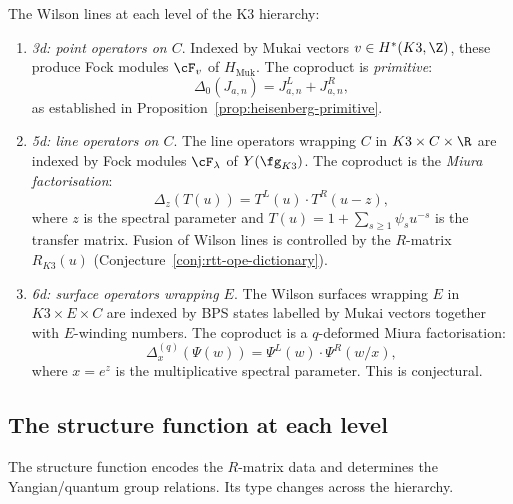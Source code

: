 \begin{construction}
\label{constr:k3-wilson-hierarchy}
The Wilson lines at each level of the K3 hierarchy:
\begin{enumerate}[label=\textup{(\roman*)}]
 \item \emph{3d: point operators on $C$}. Indexed by Mukai vectors $v \in H^*(K3, \Z)$, these produce Fock modules $\cF_v$ of $H_{\mathrm{Muk}}$. The coproduct is \emph{primitive}:
 \[
 \Delta_0(J_{a,n}) = J_{a,n}^L + J_{a,n}^R,
 \]
 as established in Proposition~\ref{prop:heisenberg-primitive}.

 \item \emph{5d: line operators on $C$}. The line operators wrapping $C$ in $K3 \times C \times \R$ are indexed by Fock modules $\cF_\lambda$ of $Y(\fg_{K3})$. The coproduct is the \emph{Miura factorisation}:
 \[
 \Delta_z(T(u)) = T^L(u) \cdot T^R(u - z),
 \]
 where $z$ is the spectral parameter and $T(u) = 1 + \sum_{s \geq 1} \psi_s u^{-s}$ is the transfer matrix. Fusion of Wilson lines is controlled by the $R$-matrix $R_{K3}(u)$ (Conjecture~\ref{conj:rtt-ope-dictionary}).

 \item \emph{6d: surface operators wrapping $E$}. The Wilson surfaces wrapping $E$ in $K3 \times E \times C$ are indexed by BPS states labelled by Mukai vectors together with $E$-winding numbers. The coproduct is a $q$-deformed Miura factorisation:
 \[
 \Delta_x^{(q)}(\Psi(w)) = \Psi^L(w) \cdot \Psi^R(w/x),
 \]
 where $x = e^z$ is the multiplicative spectral parameter. This is conjectural.
\end{enumerate}
\end{construction}

\subsection{The structure function at each level}
\label{subsec:k3-structure-fn}

The structure function encodes the $R$-matrix data and determines the Yangian/quantum group relations. Its type changes across the hierarchy.

